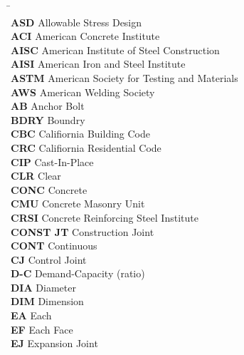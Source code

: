 \setlength{\parindent}{0.2in}
\vspace{-0.3in}
\begin{tabbing}
\hspace*{4cm} \= \kill
    \indent\textbf{}         \>  {}\\
    \indent\textbf{ASD}      \>  {Allowable Stress Design}\\
    \indent\textbf{ACI}      \>  {American Concrete Institute}\\
    \indent\textbf{AISC}     \>  {American Institute of Steel Construction}\\
    \indent\textbf{AISI}     \>  {American Iron and Steel Institute}\\
    \indent\textbf{ASTM}     \>  {American Society for Testing and Materials}\\
    \indent\textbf{AWS}      \>  {American Welding Society}\\
    \indent\textbf{AB}       \>  {Anchor Bolt}\\
    \indent\textbf{BDRY}     \>  {Boundry}\\
    \indent\textbf{CBC}      \>  {Califiornia Building Code}\\
    \indent\textbf{CRC}      \>  {Califiornia Residential Code}\\
    \indent\textbf{CIP}      \>  {Cast-In-Place}\\
    \indent\textbf{CLR}      \>  {Clear}\\
    \indent\textbf{CONC}     \>  {Concrete}\\
    \indent\textbf{CMU}      \>  {Concrete Masonry Unit}\\
    \indent\textbf{CRSI}     \>  {Concrete Reinforcing Steel Institute}\\
    \indent\textbf{CONST JT} \>  {Construction Joint}\\
    \indent\textbf{CONT}     \>  {Continuous}\\
    \indent\textbf{CJ}       \>  {Control Joint}\\
    \indent\textbf{D-C}      \>  {Demand-Capacity (ratio)}\\
    \indent\textbf{DIA}      \>  {Diameter}\\
    \indent\textbf{DIM}      \>  {Dimension}\\
    \indent\textbf{EA}       \>  {Each}\\
    \indent\textbf{EF}       \>  {Each Face}\\
    \indent\textbf{EJ}       \>  {Expansion Joint}\\

\end{tabbing}
